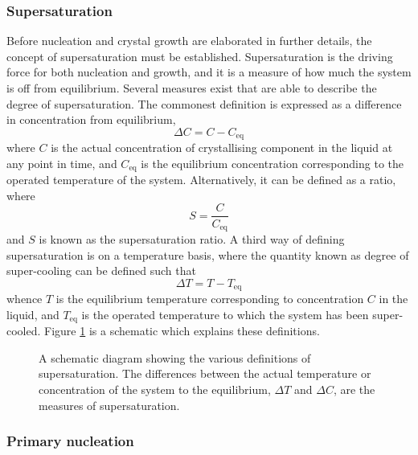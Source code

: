 \subsubsection{Supersaturation}

Before nucleation and crystal growth are elaborated in further details, the concept of supersaturation must be established. Supersaturation is the driving force for both nucleation and growth, and it is a measure of how much the system is off from equilibrium. Several measures exist that are able to describe the degree of supersaturation. The commonest definition is expressed as a difference in concentration from equilibrium,
\begin{equation}\label{eq:deltaC}
    \Delta C = C - C_{\mathrm{eq}}
\end{equation}
where $C$ is the actual concentration of crystallising component in the liquid at any point in time, and $C_{\mathrm{eq}}$ is the equilibrium concentration corresponding to the operated temperature of the system. Alternatively, it can be defined as a ratio, where
\begin{equation} \label{eq: supersaturation ratio}
    S = \frac{C}{C_{\mathrm{eq}}}
\end{equation}
and $S$ is known as the supersaturation ratio. A third way of defining supersaturation is on a temperature basis, where the quantity known as degree of super-cooling can be defined such that
\begin{equation} \label{eq:deltaT}
     \Delta T = T - T_{\mathrm{eq}}
\end{equation}
whence $T$ is the equilibrium temperature corresponding to concentration $C$ in the liquid, and $T_{\mathrm{eq}}$ is the operated temperature to which the system has been super-cooled. Figure \ref{fig:supersaturation} is a schematic which explains these definitions.

\begin{figure}[h]
\centering

\caption{A schematic diagram showing the various definitions of supersaturation. The differences between the actual temperature or concentration of the system to the equilibrium, $\Delta T$ and $\Delta C$, are the measures of supersaturation.}
\label{fig:supersaturation}
\end{figure}

\subsubsection{Primary nucleation}\label{sec:primary nucleation}

